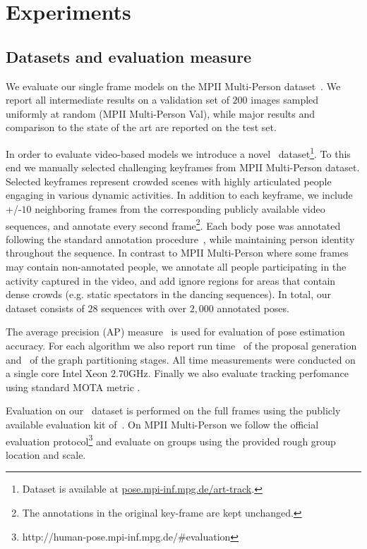 \section{Experiments}
\label{seq:experiments}



\subsection{Datasets and evaluation measure}
 We evaluate our single frame models on
the MPII Multi-Person dataset~\cite{andriluka14cvpr}. 
We report all intermediate results on a validation set of $200$ images
sampled uniformly at random (MPII Multi-Person Val), while major
results and comparison to the state of the art are reported on the
test set.

 In order to evaluate video-based models we
introduce a novel \videodata~dataset\footnote{Dataset is available at \url{pose.mpi-inf.mpg.de/art-track}.}.
 To this end we manually selected challenging
keyframes from MPII Multi-Person dataset. Selected
keyframes represent crowded scenes with highly articulated
people engaging in various dynamic activities. In addition to each
keyframe, we include +/-$10$ neighboring frames from the
corresponding publicly available video sequences, and annotate every
second frame\footnote{The annotations in the original key-frame are kept unchanged.}.
Each body pose was annotated following the standard annotation
procedure~\cite{andriluka14cvpr}, while maintaining person identity
throughout the sequence. In contrast to MPII Multi-Person where some
frames may contain non-annotated people, we annotate all people
participating in the activity captured in the video, and add ignore
regions for areas that contain dense crowds (e.g. static spectators in
the dancing sequences).  In total, our dataset consists of $28$
sequences with over $2,000$ annotated poses.



The average precision (AP) measure~\cite{pishchulin16cvpr} is used for evaluation of pose estimation
accuracy. For each algorithm we also report run time \timecnn~of the proposal generation
and \timeinfer~of the graph partitioning stages. All time measurements were conducted on a single
core Intel Xeon $2.70$GHz. Finally we also evaluate tracking perfomance using standard MOTA metric \cite{Bernardin:2008:CLE}.

Evaluation on our \videodata~dataset is performed on the full
frames using the publicly available evaluation kit
of~\cite{andriluka14cvpr}. On MPII Multi-Person we follow the official
evaluation
protocol\footnote{http://human-pose.mpi-inf.mpg.de/\#evaluation} and
evaluate on groups using the provided rough group location and scale.

